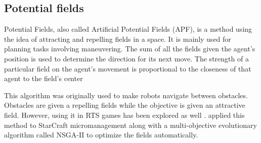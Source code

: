 \subsection{Potential fields}\label{subsec:potential-fields}

Potential Fields, also called Artificial Potential Fields (APF), is a
method using the idea of attracting and repelling fields in a
space. It is mainly used for planning tasks involving maneuvering.
The sum of all the fields given the agent's position is used to
determine the direction for its next move. The strength of a
particular field on the agent's movement is proportional to the
closeness of that agent to the field's center

This algorithm was originally used to make robots navigate between
obstacles. Obstacles are given a repelling fields while the objective
is given an attractive field. However, using it in RTS games has been
explored as well \cite{HaJo08}. \citet{BoAu12} applied this method to
StarCraft micromanagement along with a multi-objective evolutionary
algorithm called NSGA-II to optimize the fields automatically.

